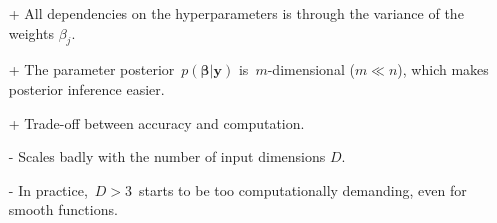 \documentclass[8pt]{beamer} %
\begin{document}
\begin{frame}[t]
\begin{tcolorbox}[colframe=blue!20, colback=white, title=\small Properties of the method, colbacktitle=lightblue, coltitle=black, boxrule=0.5pt]
\begin{itemize}
\item[+]  All dependencies on the hyperparameters is through the variance of the weights $\beta_j$.



\item[+]  The parameter posterior\, $p(\bm{\beta}|\bm{y})$ is\, $m$-dimensional ($m\ll n$), which makes posterior inference easier.

\item[+] Trade-off between accuracy and computation.

\item[-] Scales badly with the number of input dimensions $D$.

\item[-] In practice,\, $D>3$\, starts to be too computationally demanding, even for smooth functions.
\end{itemize}
\end{tcolorbox}
\end{frame}
\end{document}
